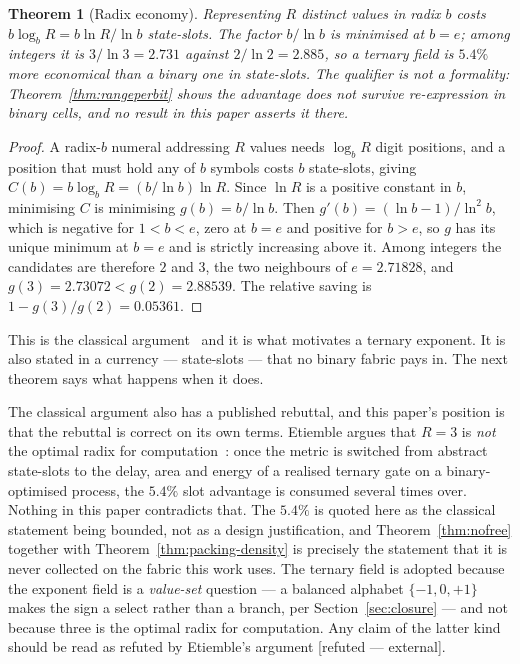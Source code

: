 \documentclass[11pt]{article}
\newtheorem{theorem}{Theorem}
\theoremstyle{definition}
\begin{document}
\begin{theorem}[Radix economy]
\label{thm:economy}
Representing $R$ distinct values in radix $b$ costs $b\log_b R = b\ln R/\ln b$
state-slots. The factor $b/\ln b$ is minimised at $b = e$; among integers it is
$3/\ln 3 = 2.731$ against $2/\ln 2 = 2.885$, so a ternary field is $5.4\%$ more
economical than a binary one \emph{in state-slots}. The qualifier is not a
formality: Theorem~\ref{thm:rangeperbit} shows the advantage does not survive
re-expression in binary cells, and no result in this paper asserts it there.
\end{theorem}

\begin{proof}
A radix-$b$ numeral addressing $R$ values needs $\log_b R$ digit positions, and a
position that must hold any of $b$ symbols costs $b$ state-slots, giving
$C(b) = b\log_b R = (b/\ln b)\ln R$. Since $\ln R$ is a positive constant in $b$,
minimising $C$ is minimising $g(b) = b/\ln b$. Then
$g'(b) = (\ln b - 1)/\ln^{2} b$, which is negative for $1 < b < e$, zero at
$b = e$ and positive for $b > e$, so $g$ has its unique minimum at $b = e$ and is
strictly increasing above it. Among integers the candidates are therefore $2$ and
$3$, the two neighbours of $e = 2.71828$, and $g(3) = 2.73072 < g(2) = 2.88539$.
The relative saving is $1 - g(3)/g(2) = 0.05361$.
\end{proof}

This is the classical argument~\cite{hayes2001,radixeconomy} and it is what
motivates a ternary exponent. It is also stated in a currency --- state-slots ---
that no binary fabric pays in. The next theorem says what happens when it does.

The classical argument also has a published rebuttal, and this paper's position is
that the rebuttal is correct on its own terms. Etiemble argues that $R=3$ is
\emph{not} the optimal radix for computation~\cite{etiemble2019}: once the metric
is switched from abstract state-slots to the delay, area and energy of a realised
ternary gate on a binary-optimised process, the $5.4\%$ slot advantage is consumed
several times over. Nothing in this paper contradicts that. The $5.4\%$ is quoted
here as the classical statement being bounded, not as a design justification, and
Theorem~\ref{thm:nofree} together with Theorem~\ref{thm:packing-density} is
precisely the statement that it is never collected on the fabric this work uses.
The ternary field is adopted because the exponent field is a \emph{value-set}
question --- a balanced alphabet $\{-1,0,+1\}$ makes the sign a select rather than
a branch, per Section~\ref{sec:closure} --- and not because three is the optimal
radix for computation. Any claim of the latter kind should be read as refuted by
Etiemble's argument [refuted --- external].
\end{document}
